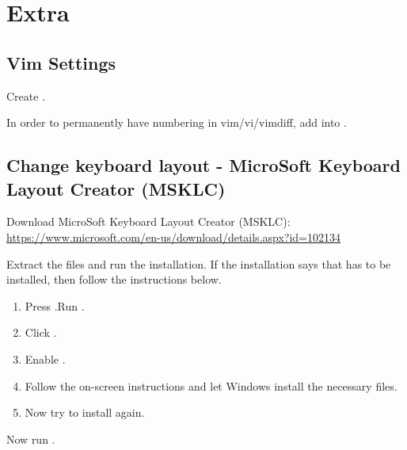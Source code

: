 \section{Extra}
\subsection{Vim Settings}

Create .

In order to permanently have numbering in vim/vi/vimdiff, add  into .

\subsection{Change keyboard layout - MicroSoft Keyboard Layout Creator (MSKLC)}
Download MicroSoft Keyboard Layout Creator (MSKLC):\\
\url{https://www.microsoft.com/en-us/download/details.aspx?id=102134}

Extract the files and run the installation. If the installation says that  has to be installed, then follow the instructions below.

\begin{enumerate}
    \item Press .Run .
    
    \item Click .
    
    \item Enable .
    
    \item Follow the on-screen instructions and let Windows install the necessary files.
    
    \item Now try to install  again.
\end{enumerate}

Now run .

